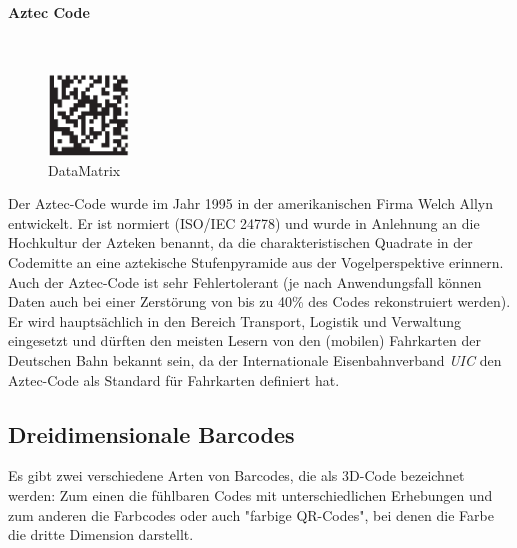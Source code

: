 \paragraph{Aztec Code}~

\begin{figure}
	\centering
	\vspace{-0.65cm}
	\includegraphics[width=0.19\textwidth]{Bilder/DataMatrix.png} 
	\vspace{-0.2cm}
	\caption[DataMatrix]{DataMatrix\footnotemark}
	\label{datamatrix}	
\end{figure}
Der Aztec-Code wurde im Jahr 1995 in der amerikanischen Firma Welch Allyn entwickelt. Er ist normiert (ISO/IEC 24778) und wurde in Anlehnung an die Hochkultur der Azteken benannt, da die charakteristischen Quadrate in der Codemitte an eine aztekische Stufenpyramide aus der Vogelperspektive erinnern. Auch der Aztec-Code ist sehr Fehlertolerant (je nach Anwendungsfall können Daten auch bei einer Zerstörung von bis zu 40\% des Codes rekonstruiert werden). Er wird hauptsächlich in den Bereich Transport, Logistik und Verwaltung eingesetzt und dürften den meisten Lesern von den (mobilen) Fahrkarten der Deutschen Bahn bekannt sein, da der Internationale Eisenbahnverband \textit{UIC} den Aztec-Code als Standard für Fahrkarten definiert hat. %


\subsection{Dreidimensionale Barcodes}
Es gibt zwei verschiedene Arten von Barcodes, die als 3D-Code bezeichnet werden:
Zum einen die fühlbaren Codes mit unterschiedlichen Erhebungen und zum anderen die Farbcodes oder auch "farbige QR-Codes", bei denen die Farbe die dritte Dimension darstellt.
~\pagebreak
